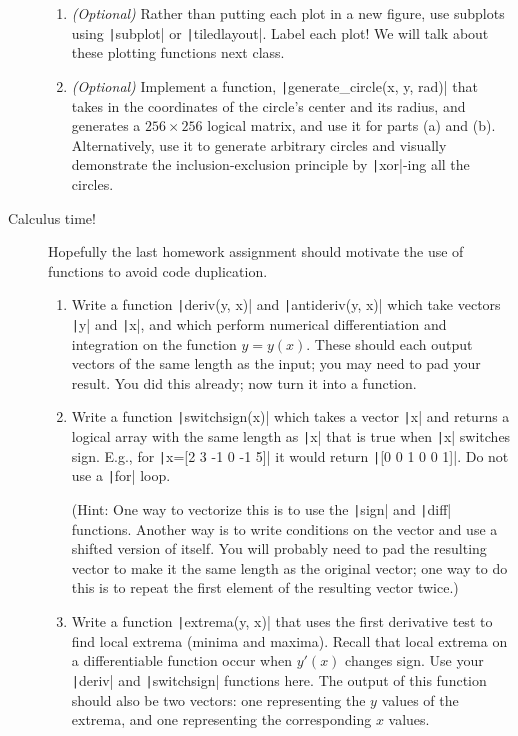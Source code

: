 \documentclass{article}
\begin{document}
\begin{description}
\begin{enumerate}
  \item \textit{(Optional)} Rather than putting each plot in a new figure, use subplots using \texttt|subplot| or \texttt|tiledlayout|. Label each plot! We will talk about these plotting functions next class.
    
  \item \textit{(Optional)} Implement a function, \texttt|generate_circle(x, y, rad)| that takes in the coordinates of the circle's center and its radius, and generates a $256\times 256$ logical matrix, and use it for parts (a) and (b). Alternatively, use it to generate arbitrary circles and visually demonstrate the inclusion-exclusion principle by \texttt|xor|-ing all the circles.
  \end{enumerate}
  
  \clearpage
\item[Calculus time!] Hopefully the last homework assignment should motivate the use of functions to avoid code duplication.
  \begin{enumerate}
  \item Write a function \texttt|deriv(y, x)| and \texttt|antideriv(y, x)| which take vectors \texttt|y| and \texttt|x|, and which perform numerical differentiation and integration on the function $y=y(x)$. These should each output vectors of the same length as the input; you may need to pad your result. You did this already; now turn it into a function.
    
  \item Write a function \texttt|switchsign(x)| which takes a vector \texttt|x| and returns a logical array with the same length as \texttt|x| that is true when \texttt|x| switches sign. E.g., for \texttt|x=[2 3 -1 0 -1 5]| it would return \texttt|[0 0 1 0 0 1]|. Do not use a \texttt|for| loop.
    
    (Hint: One way to vectorize this is to use the \texttt|sign| and \texttt|diff| functions. Another way is to write conditions on the vector and use a shifted version of itself. You will probably need to pad the resulting vector to make it the same length as the original vector; one way to do this is to repeat the first element of the resulting vector twice.)
    
  \item Write a function \texttt|extrema(y, x)| that uses the first derivative test to find local extrema (minima and maxima). Recall that local extrema on a differentiable function occur when $y'(x)$ changes sign. Use your \texttt|deriv| and \texttt|switchsign| functions here. The output of this function should also be two vectors: one representing the $y$ values of the extrema, and one representing the corresponding $x$ values.
    

\end{enumerate}
\end{description}
\end{document}
